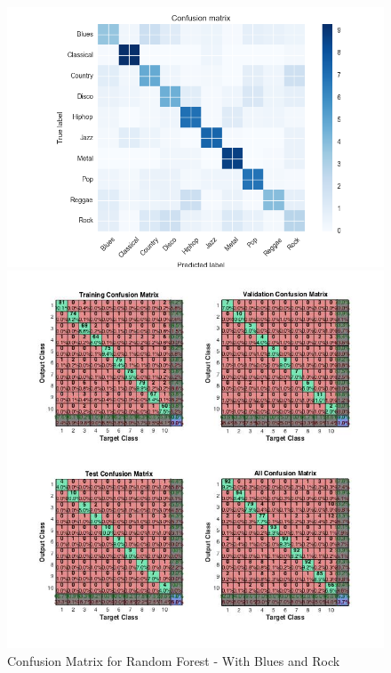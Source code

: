 \documentclass{article} %
\begin{document}
\begin{figure}[!ht]
\begin{center}
\begin{minipage}[b]{0.45\linewidth}
	\caption{Confusion Matrix for Random Forest - With Blues and Rock}
	\includegraphics[scale=0.35]{ConfusionMatrix-RandomForest.png}
\end{minipage}
\quad
\begin{minipage}[b]{0.45\linewidth}
	\includegraphics[scale=0.35]{ConfusionMatrix-NN.jpg}
\end{minipage}
\end{center}
\end{figure}
\end{document}
